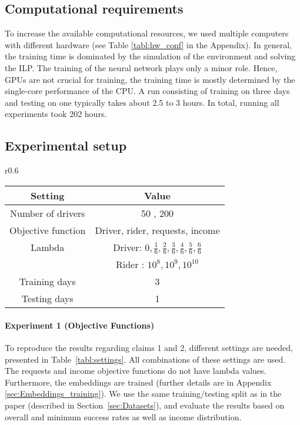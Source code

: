 \subsection{Computational requirements}

To increase the available computational resources, we used multiple computers with different hardware (see Table \ref{tabl:hw_conf} in the Appendix). In general, the training time is dominated by the simulation of the environment and solving the ILP. The training of the neural network plays only a minor role. Hence, GPUs are not crucial for training, the training time is mostly determined by the single-core performance of the CPU. A run consisting of training on three days and testing on one typically takes about 2.5 to 3 hours. In total, running all experiments took 202 hours.

\subsection{Experimental setup} \label{sec:process}






\begin{wraptable}{r}{0.6\textwidth}
    \small
    \centering
    \begin{tabular}{| c | c |}
    \hline 
        \textbf{Setting} & \textbf{Value} \\
        \hline 
        Number of drivers & 50 , 200 \\
        Objective function & Driver, rider, requests, income \\ 
        Lambda & Driver: $0, \frac{1}{6} , \frac{2}{6} , \frac{3}{6} , \frac{4}{6} , \frac{5}{6} , \frac{6}{6}$  \\
         & Rider : {$10^8, 10^9, 10^{10}$}  \\
        Training days & 3 \\
        Testing days & 1 \\
        \hline 
    \end{tabular}
    \caption{Settings used for the experiments}
    \label{tabl:settings}
\end{wraptable}

\paragraph{Experiment 1 (Objective Functions)} To reproduce the results regarding claims 1 and 2, different settings are needed, presented in Table~\ref{tabl:settings}. All combinations of these settings are used. The requests and income objective functions do not have lambda values. Furthermore, the embeddings are trained (further details are in Appendix \ref{sec:Embeddings_training}). We use the same training/testing split as in the paper (described in Section~\ref{sec:Datasets}), and evaluate the results based on overall and minimum success rates as well as income distribution.

